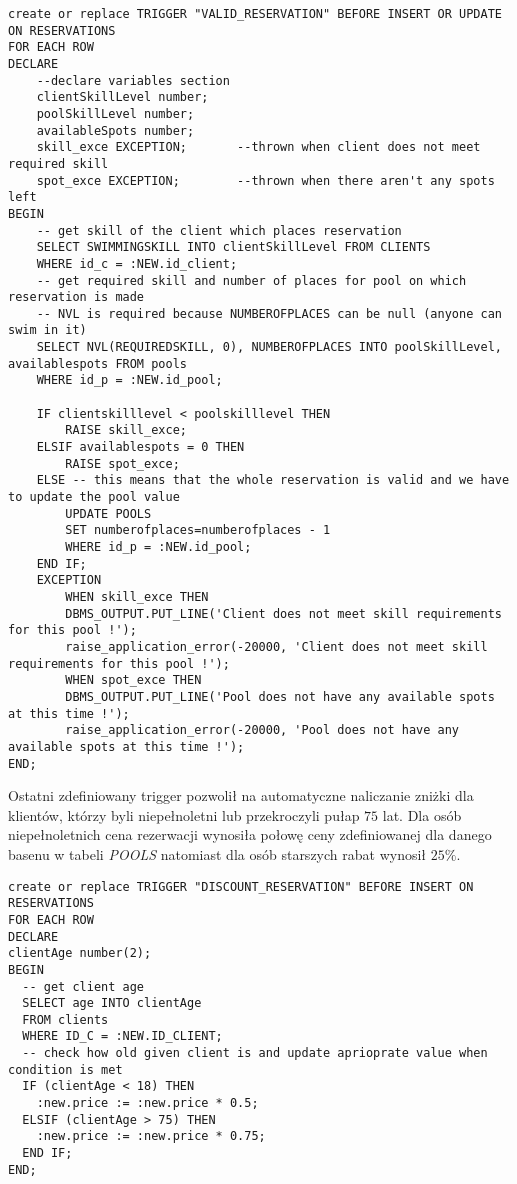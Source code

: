 \documentclass[a4paper]{article}
\begin{document}
\newpage

\begin{verbatim}
create or replace TRIGGER "VALID_RESERVATION" BEFORE INSERT OR UPDATE ON RESERVATIONS
FOR EACH ROW
DECLARE
    --declare variables section
    clientSkillLevel number;
    poolSkillLevel number;
    availableSpots number;
    skill_exce EXCEPTION;       --thrown when client does not meet required skill
    spot_exce EXCEPTION;        --thrown when there aren't any spots left
BEGIN
    -- get skill of the client which places reservation
    SELECT SWIMMINGSKILL INTO clientSkillLevel FROM CLIENTS
    WHERE id_c = :NEW.id_client;
    -- get required skill and number of places for pool on which reservation is made
    -- NVL is required because NUMBEROFPLACES can be null (anyone can swim in it)
    SELECT NVL(REQUIREDSKILL, 0), NUMBEROFPLACES INTO poolSkillLevel, availablespots FROM pools
    WHERE id_p = :NEW.id_pool;
    
    IF clientskilllevel < poolskilllevel THEN
        RAISE skill_exce;
    ELSIF availablespots = 0 THEN
        RAISE spot_exce;
    ELSE -- this means that the whole reservation is valid and we have to update the pool value
        UPDATE POOLS
        SET numberofplaces=numberofplaces - 1
        WHERE id_p = :NEW.id_pool;
    END IF;
    EXCEPTION
        WHEN skill_exce THEN
        DBMS_OUTPUT.PUT_LINE('Client does not meet skill requirements for this pool !');
        raise_application_error(-20000, 'Client does not meet skill requirements for this pool !');
        WHEN spot_exce THEN
        DBMS_OUTPUT.PUT_LINE('Pool does not have any available spots at this time !');
        raise_application_error(-20000, 'Pool does not have any available spots at this time !');
END;
\end{verbatim}

\newpage

Ostatni zdefiniowany trigger pozwolił na automatyczne naliczanie zniżki dla klientów, którzy byli niepełnoletni lub przekroczyli pułap $75$ lat. Dla osób niepełnoletnich cena rezerwacji wynosiła połowę ceny zdefiniowanej dla danego basenu w tabeli \textit{POOLS} natomiast dla osób starszych rabat wynosił $25\%$.

\begin{verbatim}
create or replace TRIGGER "DISCOUNT_RESERVATION" BEFORE INSERT ON RESERVATIONS
FOR EACH ROW
DECLARE
clientAge number(2);
BEGIN
  -- get client age
  SELECT age INTO clientAge
  FROM clients
  WHERE ID_C = :NEW.ID_CLIENT;
  -- check how old given client is and update aprioprate value when condition is met
  IF (clientAge < 18) THEN
    :new.price := :new.price * 0.5;
  ELSIF (clientAge > 75) THEN
    :new.price := :new.price * 0.75;
  END IF;
END;
\end{verbatim}
\end{document}
